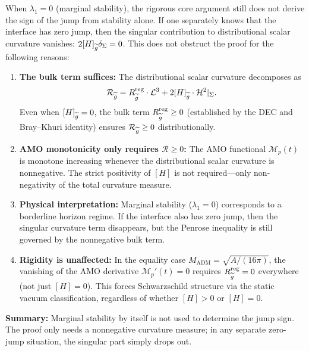 \begin{remark}\label{rem:MarginalStabilityNonObstruction}\label{rem:EdgeCases}
When $\lambda_1 = 0$ (marginal stability), the rigorous core argument still does not derive the sign of the jump from stability alone. If one separately knows that the interface has zero jump, then the singular contribution to distributional scalar curvature vanishes: $2[H]_{\widetilde{g}} \delta_\Sigma = 0$. This does not obstruct the proof for the following reasons:

\begin{enumerate}
    \item \textbf{The bulk term suffices:} The distributional scalar curvature decomposes as
    \begin{equation}
        \mathcal{R}_{\widetilde{g}} = R_{\widetilde{g}}^{\mathrm{reg}} \cdot \mathcal{L}^3 + 2[H]_{\widetilde{g}} \cdot \mathcal{H}^2|_\Sigma.
    \end{equation}
    Even when $[H]_{\widetilde{g}} = 0$, the bulk term $R_{\widetilde{g}}^{\mathrm{reg}} \ge 0$ (established by the DEC and Bray--Khuri identity) ensures $\mathcal{R}_{\widetilde{g}} \ge 0$ distributionally.
    
    \item \textbf{AMO monotonicity only requires $\mathcal{R} \ge 0$:} The AMO functional $\mathcal{M}_p(t)$ is monotone increasing whenever the distributional scalar curvature is nonnegative. The strict positivity of $[H]$ is not required---only non-negativity of the total curvature measure.
    
    \item \textbf{Physical interpretation:} Marginal stability ($\lambda_1 = 0$) corresponds to a borderline horizon regime. If the interface also has zero jump, then the singular curvature term disappears, but the Penrose inequality is still governed by the nonnegative bulk term.
    
    \item \textbf{Rigidity is unaffected:} In the equality case $M_{\mathrm{ADM}} = \sqrt{A/(16\pi)}$, the vanishing of the AMO derivative $\mathcal{M}_p'(t) = 0$ requires $R_{\widetilde{g}}^{\mathrm{reg}} = 0$ everywhere (not just $[H] = 0$). This forces Schwarzschild structure via the static vacuum classification, regardless of whether $[H] > 0$ or $[H] = 0$.
\end{enumerate}

\textbf{Summary:} Marginal stability by itself is not used to determine the jump sign. The proof only needs a nonnegative curvature measure; in any separate zero-jump situation, the singular part simply drops out.
\end{remark}

